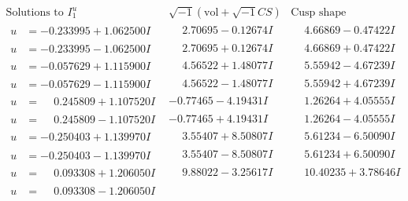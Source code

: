 \documentclass[1p]{elsarticle_modified}
\theoremstyle{definition}
\newcommand{\I}{\sqrt{-1}}
\begin{document}
$$\begin{array}{c|c|c}  
\text{Solutions to }I^u_{1}& \I (\text{vol} + \sqrt{-1}CS) & \text{Cusp shape}\\
 \hline 
\begin{aligned}
u &= -0.233995 + 1.062500 I\end{aligned}
 & \phantom{-}2.70695 - 0.12674 I & \phantom{-}4.66869 - 0.47422 I \\ \hline\begin{aligned}
u &= -0.233995 - 1.062500 I\end{aligned}
 & \phantom{-}2.70695 + 0.12674 I & \phantom{-}4.66869 + 0.47422 I \\ \hline\begin{aligned}
u &= -0.057629 + 1.115900 I\end{aligned}
 & \phantom{-}4.56522 + 1.48077 I & \phantom{-}5.55942 - 4.67239 I \\ \hline\begin{aligned}
u &= -0.057629 - 1.115900 I\end{aligned}
 & \phantom{-}4.56522 - 1.48077 I & \phantom{-}5.55942 + 4.67239 I \\ \hline\begin{aligned}
u &= \phantom{-}0.245809 + 1.107520 I\end{aligned}
 & -0.77465 - 4.19431 I & \phantom{-}1.26264 + 4.05555 I \\ \hline\begin{aligned}
u &= \phantom{-}0.245809 - 1.107520 I\end{aligned}
 & -0.77465 + 4.19431 I & \phantom{-}1.26264 - 4.05555 I \\ \hline\begin{aligned}
u &= -0.250403 + 1.139970 I\end{aligned}
 & \phantom{-}3.55407 + 8.50807 I & \phantom{-}5.61234 - 6.50090 I \\ \hline\begin{aligned}
u &= -0.250403 - 1.139970 I\end{aligned}
 & \phantom{-}3.55407 - 8.50807 I & \phantom{-}5.61234 + 6.50090 I \\ \hline\begin{aligned}
u &= \phantom{-}0.093308 + 1.206050 I\end{aligned}
 & \phantom{-}9.88022 - 3.25617 I & \phantom{-}10.40235 + 3.78646 I \\ \hline\begin{aligned}
u &= \phantom{-}0.093308 - 1.206050 I\end{aligned}

\end{array}$$
\end{document}
